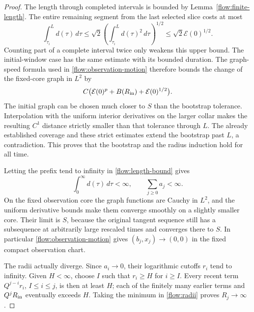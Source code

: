 \begin{proof}
The length through completed intervals is bounded by
Lemma~\ref{flow:finite-length}.  The entire remaining segment
from the last selected slice costs at most
\begin{equation}\label{flow:last-length}
 \int_{\tau_i}^L d(\tau)\,d\tau
 \le\sqrt2\left(\int_{\tau_i}^Ld(\tau)^2\,d\tau\right)^{1/2}
 \le\sqrt2 \mathcal E(0)^{1/2}.
\end{equation}
Counting part of a complete interval twice only weakens this
upper bound.  The initial-window case has the same estimate
with its bounded duration.  The graph-speed formula used in
\eqref{flow:observation-motion} therefore bounds the change
of the fixed-core graph in $L^2$ by
\[
 C\bigl(\mathcal E(0)^p+B(R_{\rm in})+\mathcal E(0)^{1/2}\bigr).
\]
The initial graph can be chosen much closer to $S$ than the
bootstrap tolerance.  Interpolation with the uniform interior
derivatives on the larger collar makes the resulting $C^1$
distance strictly smaller than that tolerance through $L$.
The already established coverage and these strict estimates
extend the bootstrap past $L$, a contradiction.  This proves
that the bootstrap and the radius induction hold for all time.

Letting the prefix tend to infinity in
\eqref{flow:length-bound} gives
\begin{equation}\label{flow:finite-total-length}
 \int_0^\infty d(\tau)\,d\tau<\infty,
 \qquad \sum_{j\ge0}a_j<\infty.
\end{equation}
On the fixed observation core the graph functions are Cauchy
in $L^2$, and the uniform derivative bounds make them converge
smoothly on a slightly smaller core.  Their limit is $S$,
because the original tangent sequence still has a subsequence
at arbitrarily large rescaled times and converges there to
$S$.  In particular \eqref{flow:observation-motion} gives
$(b_j,x_j)\to(0,0)$ in the fixed compact observation chart.

The radii actually diverge.  Since $a_i\to0$, their logarithmic
cutoffs $r_i$ tend to infinity.  Given $H<\infty$, choose $I$
such that $r_i\ge H$ for $i\ge I$.  Every recent term
$Q^{j-i}r_i$, $I\le i\le j$, is then at least $H$; each of
the finitely many earlier terms and $Q^jR_{\rm in}$ eventually
exceeds $H$.  Taking the minimum in \eqref{flow:radii} proves
$R_j\to\infty$.


\end{proof}
